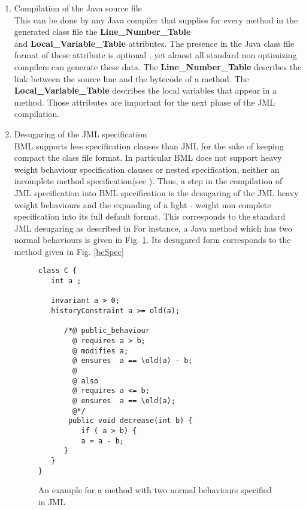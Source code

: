 \begin{enumerate}
\item Compilation of the Java source file \\
  This can be done by any Java compiler that supplies for every method in the generated class file 
the \textbf{Line\_Number\_Table} \\ 
and \textbf{Local\_Variable\_Table}  attributes. The presence in the Java class file format of 
these attribute is optional \cite{VMSpec}, yet almost all standard non optimizing compilers can generate these data. 
The \textbf{Line\_Number\_Table} describes the link between the source line and the bytecode of a method.  
The \textbf{Local\_Variable\_Table} describes the local variables that appear in a method. 
Those attributes are important for the next phase of the JML compilation.

\item Desugaring of the JML specification \\
      BML supports less specification clauses than JML for the sake of keeping compact the class file format.
      In particular BML does not support heavy weight behaviour specification clauses or nested specification, neither an incomplete
      method specification(see  \cite{JMLRefMan}).
      Thus, a step in the compilation of JML specification into BML specification is the desugaring of the JML heavy weight
      behaviours and the expanding of a light - weight non complete specification into its full default format.
      This corresponds to the standard JML desugaring as described  in \cite{RT03djml}
      For instance, a Java method which has two normal behaviours is given in Fig. \ref{JmlSpec}. 
      Its desugared form corresponds to the method given in Fig. \ref{bcSpec}

\begin{figure}
\begin{verbatim}
class C {
   int a ;

   invariant a > 0; 
   historyConstraint a >= old(a);

      /*@ public_behaviour
        @ requires a > b;
        @ modifies a;
        @ ensures  a == \old(a) - b;  
        @
        @ also
        @ requires a <= b;
        @ ensures  a == \old(a);
        @*/
       public void decrease(int b) {
          if ( a > b) {
          a = a - b;
      }
   }
}
\end{verbatim}
\caption{\sc An example for a method with two normal behaviours specified in JML} \label{JmlSpec}
\end{figure}


\end{enumerate}
